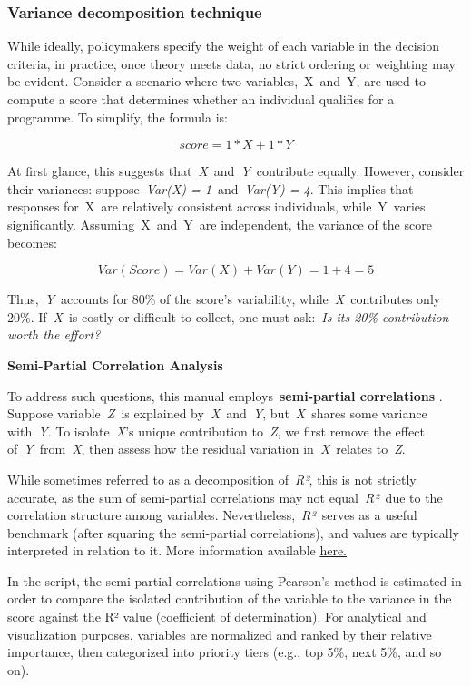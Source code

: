 \documentclass[
]{article}
\begin{document}
\subsubsection{Variance decomposition
technique}\label{variance-decomposition-technique}

While ideally, policymakers specify the weight of each variable in the
decision criteria, in practice, once theory meets data, no strict
ordering or weighting may be evident. Consider a scenario where two
variables,~X~and~Y, are used to compute a score that determines whether
an individual qualifies for a programme. To simplify, the formula is:

\[
score= 1 * X + 1 * Y
\]

At first glance, this suggests that~\emph{X}~and~\emph{Y}~contribute
equally. However, consider their variances: suppose~\emph{Var(X) =
1}~and~\emph{Var(Y) = 4}. This implies that responses for~X~are
relatively consistent across individuals, while~Y~varies significantly.
Assuming~X~and~Y~are independent, the variance of the score becomes:

\[ Var(Score) = Var(X) + Var(Y) = 1 + 4 = 5\]

Thus,~\emph{Y}~accounts for 80\% of the score's variability,
while~\emph{X}~contributes only 20\%. If~\emph{X}~is costly or difficult
to collect, one must ask:~\emph{Is its 20\% contribution worth the
effort?}

\textbf{Semi-Partial Correlation Analysis}

To address such questions, this manual employs~\textbf{semi-partial
correlations} . Suppose variable~\emph{Z}~is explained
by~\emph{X}~and~\emph{Y}, but~\emph{X}~shares some variance
with~\emph{Y}. To isolate~\emph{X}'s unique contribution to~\emph{Z}, we
first remove the effect of~\emph{Y}~from~\emph{X}, then assess how the
residual variation in~\emph{X}~relates to~\emph{Z}.

While sometimes referred to as a decomposition of~\emph{R²}, this is not
strictly accurate, as the sum of semi-partial correlations may not
equal~\emph{R²}~due to the correlation structure among variables.
Nevertheless,~\emph{R²}~serves as a useful benchmark (after squaring the
semi-partial correlations), and values are typically interpreted in
relation to it. More information available
\href{https://www.statisticshowto.com/partial-correlation/}{here.}

In the script, the semi partial correlations using Pearson's method is
estimated in order to compare the isolated contribution of the variable
to the variance in the score against the R² value (coefficient of
determination). For analytical and visualization purposes, variables are
normalized and ranked by their relative importance, then categorized
into priority tiers (e.g., top 5\%, next 5\%, and so on).
\end{document}
